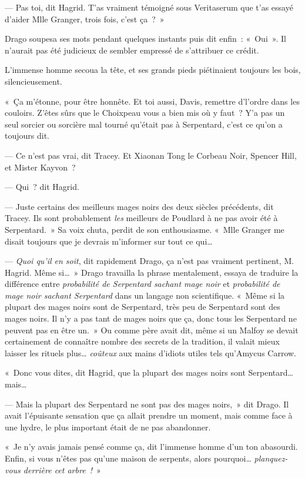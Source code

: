 --- Pas toi, dit Hagrid. T'as vraiment témoigné sous Veritaserum que t'as essayé d'aider Mlle Granger, trois fois, c'est ça~?~»

Drago soupesa ses mots pendant quelques instants puis dit enfin~: «~Oui~». Il n'aurait pas été judicieux de sembler empressé de s'attribuer ce crédit.

L'immense homme secoua la tête, et ses grands pieds piétinaient toujours les bois, silencieusement.

«~Ça m'étonne, pour être honnête. Et toi aussi, Davis, remettre d'l'ordre dans les couloirs. Z'êtes sûrs que le Choixpeau vous a bien mis où y faut~? Y'a pas un seul sorcier ou sorcière mal tourné qu'était pas à Serpentard, c'est ce qu'on a toujours dit.

--- Ce n'est pas vrai, dit Tracey. Et Xiaonan Tong le Corbeau Noir, Spencer Hill, et Mister Kayvon~?

--- Qui~? dit Hagrid.

--- Juste certains des meilleurs mages noirs des deux siècles précédents, dit Tracey. Ils sont probablement \emph{les} meilleurs de Poudlard à ne pas avoir été à Serpentard.~» Sa voix chuta, perdit de son enthousiasme. «~Mlle Granger me disait toujours que je devrais m'informer sur tout ce qui…

--- \emph{Quoi qu'il en soit}, dit rapidement Drago, ça n'est pas vraiment pertinent, M. Hagrid. Même si…~» Drago travailla la phrase mentalement, essaya de traduire la différence entre \emph{probabilité de Serpentard sachant mage noir} et \emph{probabilité de mage noir sachant Serpentard} dans un langage non scientifique. «~Même si la plupart des mages noirs sont de Serpentard, très peu de Serpentard sont des mages noirs. Il n'y a pas tant de mages noirs que ça, donc tous les Serpentard ne peuvent pas en être un.~» Ou comme père avait dit, même si un Malfoy se devait certainement de connaître nombre des secrets de la tradition, il valait mieux laisser les rituels plus… \emph{coûteux} aux mains d'idiots utiles tels qu'Amycus Carrow.

«~Donc vous dites, dit Hagrid, que la plupart des mages noirs sont Serpentard… mais…

--- Mais la plupart des Serpentard ne sont pas des mages noirs,~» dit Drago. Il avait l'épuisante sensation que ça allait prendre un moment, mais comme face à une hydre, le plus important était de ne pas abandonner.

«~Je n'y avais jamais pensé comme ça, dit l'immense homme d'un ton abasourdi. Enfin, si vous n'êtes pas qu'une maison de serpents, alors pourquoi… \emph{planquez-vous derrière cet arbre~!}~»

